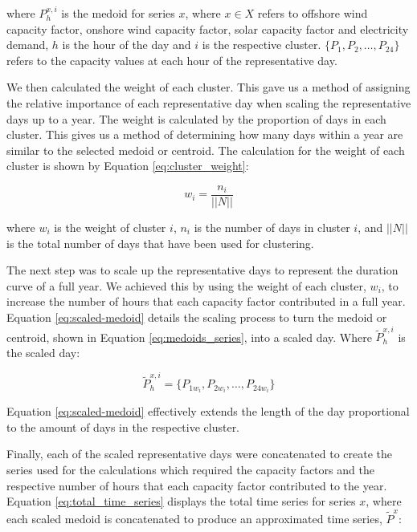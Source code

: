 \noindent where $P^{x,i}_{h}$ is the medoid for series $x$, where $x\in X$ refers to offshore wind capacity factor, onshore wind capacity factor, solar capacity factor and electricity demand, $h$ is the hour of the day and $i$ is the respective cluster. $\{P_1, P_2, \ldots , P_{24}\}$ refers to the capacity values at each hour of the representative day.

We then calculated the weight of each cluster. This gave us a method of assigning the relative importance of each representative day when scaling the representative days up to a year. The weight is calculated by the proportion of days in each cluster. This gives us a method of determining how many days within a year are similar to the selected medoid or centroid. The calculation for the weight of each cluster is shown by Equation \ref{eq:cluster_weight}:

\begin{equation}
\label{eq:cluster_weight}
w_i = \frac{n_i}{||N||} 
\end{equation} 

\noindent where $w_i$ is the weight of cluster $i$, $n_i$ is the number of days in cluster $i$, and $||N||$ is the total number of days that have been used for clustering. 


The next step was to scale up the representative days to represent the duration curve of a full year. We achieved this by using the weight of each cluster, $w_i$, to increase the number of hours that each capacity factor contributed in a full year. Equation \ref{eq:scaled-medoid} details the scaling process to turn the medoid or centroid, shown in Equation \ref{eq:medoids_series}, into a scaled day. Where $\widetilde{P}^{x,i}_{h}$ is the scaled day:

\begin{equation}
\label{eq:scaled-medoid}
\widetilde{P}^{x,i}_{h} =  \{P_{1w_i}, P_{2w_i}, \ldots, P_{24w_i}\}
\end{equation} 

\noindent Equation \ref{eq:scaled-medoid} effectively extends the length of the day proportional to the amount of days in the respective cluster.



Finally, each of the scaled representative days were concatenated to create the series used for the calculations which required the capacity factors and the respective number of hours that each capacity factor contributed to the year. Equation \ref{eq:total_time_series} displays the total time series for series $x$, where each scaled medoid is concatenated to produce an approximated time series, $\widetilde{P}^x$:


